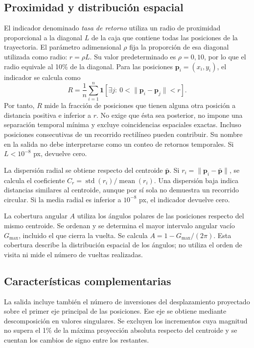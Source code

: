 \subsection{Proximidad y distribución espacial}

El indicador denominado \textit{tasa de retorno} utiliza un radio de proximidad proporcional a la diagonal $L$ de la caja que contiene todas las posiciones de la trayectoria. El parámetro adimensional $\rho$ fija la proporción de esa diagonal utilizada como radio: $r=\rho L$. Su valor predeterminado es $\rho=0{,}10$, por lo que el radio equivale al 10\% de la diagonal. Para las posiciones $\mathbf p_i=(x_i,y_i)$, el indicador se calcula como
\begin{equation}
 R=\frac{1}{n}\sum_{i=1}^{n}
 \mathbf{1}\!\left[\exists j:\ 0<\|\mathbf p_i-\mathbf p_j\|<r\right].
\end{equation}
Por tanto, $R$ mide la fracción de posiciones que tienen alguna otra posición a distancia positiva e inferior a $r$. No exige que ésta sea posterior, no impone una separación temporal mínima y excluye coincidencias espaciales exactas. Incluso posiciones consecutivas de un recorrido rectilíneo pueden contribuir. Su nombre en la salida no debe interpretarse como un conteo de retornos temporales. Si $L<10^{-8}$ px, devuelve cero.

La dispersión radial se obtiene respecto del centroide $\bar{\mathbf p}$. Si $r_i=\|\mathbf p_i-\bar{\mathbf p}\|$, se calcula el coeficiente $C_r=\operatorname{std}(r_i)/\operatorname{mean}(r_i)$. Una dispersión baja indica distancias similares al centroide, aunque por sí sola no demuestra un recorrido circular. Si la media radial es inferior a $10^{-8}$ px, el indicador devuelve cero.

La cobertura angular $A$ utiliza los ángulos polares de las posiciones respecto del mismo centroide. Se ordenan y se determina el mayor intervalo angular vacío $G_{\max}$, incluido el que cierra la vuelta. Se calcula $A=1-G_{\max}/(2\pi)$. Esta cobertura describe la distribución espacial de los ángulos; no utiliza el orden de visita ni mide el número de vueltas realizadas.

\subsection{Características complementarias}

La salida incluye también el número de inversiones del desplazamiento proyectado sobre el primer eje principal de las posiciones. Ese eje se obtiene mediante descomposición en valores singulares. Se excluyen los incrementos cuya magnitud no supera el 1\% de la máxima proyección absoluta respecto del centroide y se cuentan los cambios de signo entre los restantes.

